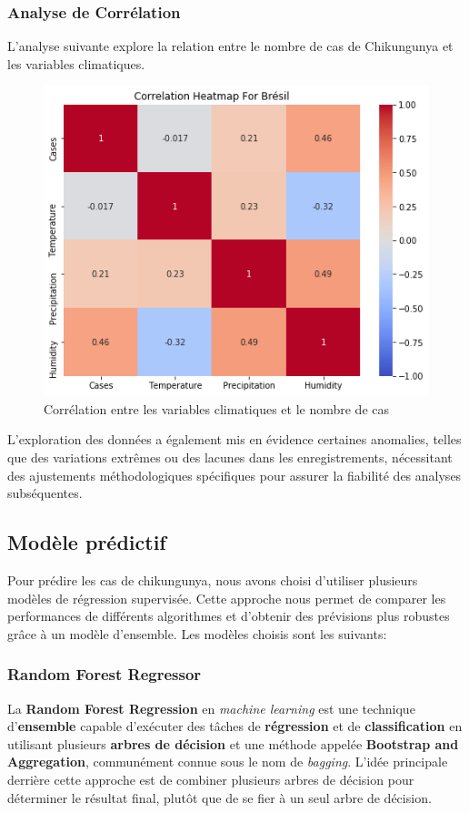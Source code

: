 \subsubsection*{Analyse de Corrélation}
L'analyse suivante explore la relation entre le nombre de cas de Chikungunya et les variables climatiques. 
\begin{figure}[h!]
	\centering
	\includegraphics[width=0.5\linewidth]{images/case_correlation}
	\caption[Corrélation entre les variables climatiques et le nombre de cas]{Corrélation entre les variables climatiques et le nombre de cas}
	\label{fig:casecorrelation}
\end{figure}

L'exploration des données a également mis en évidence certaines anomalies, telles que des variations extrêmes ou des lacunes dans les enregistrements, nécessitant des ajustements méthodologiques spécifiques pour assurer la fiabilité des analyses subséquentes.


\subsection{Modèle prédictif}
Pour prédire les cas de chikungunya, nous avons choisi d'utiliser plusieurs modèles de régression supervisée. Cette approche nous permet de comparer les performances de différents algorithmes et d'obtenir des prévisions plus robustes grâce à un modèle d'ensemble. Les modèles choisis sont les suivants:

\subsubsection{Random Forest Regressor}
La \textbf{Random Forest Regression} en \textit{machine learning} est une technique d'\textbf{ensemble} capable d'exécuter des tâches de \textbf{régression} et de \textbf{classification} en utilisant plusieurs \textbf{arbres de décision} et une méthode appelée \textbf{Bootstrap and Aggregation}, communément connue sous le nom de \textit{bagging}. L'idée principale derrière cette approche est de combiner plusieurs arbres de décision pour déterminer le résultat final, plutôt que de se fier à un seul arbre de décision.

